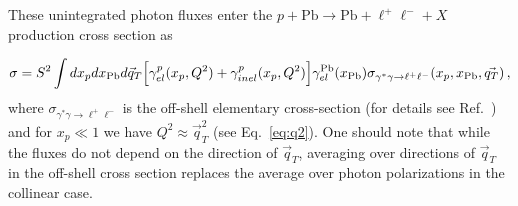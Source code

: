 These unintegrated photon fluxes enter the $p+\textrm{Pb}\rightarrow \textrm{Pb} + \ell^+\ell^- + X$ production cross section as

\begin{equation}
\sigma = S^2 \int dx_p dx_{\rm Pb} d\vec{q}_T \Big[ \gamma^{p}_{el}(x_p, Q^2) + \gamma^{p}_{inel}(x_p,Q^2) \Big]
 \gamma^{\rm Pb}_{el}(x_{\rm Pb})
\sigma_{\gamma^{*}  \gamma \rightarrow \ell^+ \ell^-}(x_p, x_{\rm Pb}, \vec{q_T}) \,,
\label{kt_factorization_formula}
\end{equation}
%
where $\sigma_{\gamma^{*} \gamma \rightarrow \ell^+ \ell^-}$ is the off-shell elementary cross-section (for details see Ref.~\cite{daSilveira:2014jla}) and  for  $x_p \ll 1$ we have $Q^2 \approx \vec{q}_T^2$ (see Eq.~\ref{eq:q2}).
One should note that while the fluxes do not depend on the direction of $\vec{q}_T$, averaging over directions
of $\vec{q}_T$ in the off-shell cross section replaces the average over photon polarizations in the collinear case.
